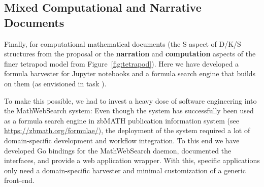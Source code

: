 \subsection{Mixed Computational and Narrative Documents}\label{subsec:software}
Finally, for computational mathematical documents (the S aspect of D/K/S structures from the \pn proposal or the \textbf{narration} and \textbf{computation} aspects of the finer tetrapod model from Figure~\ref{fig:tetrapod}).
Here we have developed a formula harvester for Jupyter notebooks and a formula search engine that builds on them (as envisioned in task ).

To make this possible, we had to invest a heavy dose of software engineering into the MathWebSearch system: Even though the system has successfully been used as a formula search engine in zbMATH publication information system (see \url{https://zbmath.org/formulae/}), the deployment of the system required a lot of domain-specific development and workflow integration.
To this end we have developed Go bindings for the MathWebSearch daemon, documented the interfaces, and provide a web application wrapper.
With this, specific applications only need a domain-specific harvester and minimal customization of a generic front-end. 



